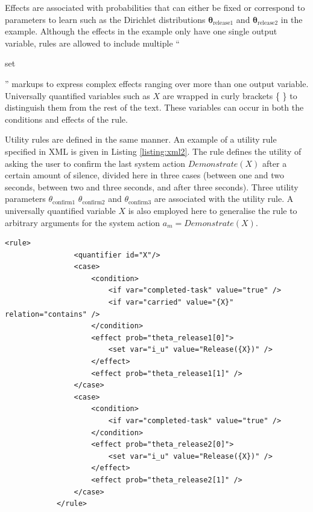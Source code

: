 Effects are associated with probabilities that can either be fixed or correspond to parameters to learn such as the Dirichlet distributions $\boldsymbol\theta_{\text{release1}}$ and $\boldsymbol\theta_{\text{release2}}$ in the example.  Although the effects in the example only have one single output variable, rules are allowed to include multiple ``\begin{small}\textsf{set}\end{small}'' markups to express complex effects ranging over more than one output variable. Universally quantified variables such as $X$ are wrapped in curly brackets \{ \} to distinguish them from the rest of the text. These variables can occur in both the conditions and effects of the rule. 

Utility rules are defined in the same manner.  An example of a utility rule specified in XML is given in Listing \ref{listing:xml2}.  The rule defines the utility of asking the user to confirm the last system action $\mathit{Demonstrate}(X)$ after a certain amount of silence, divided here in three cases (between one and two seconds, between two and three seconds, and after three seconds).  Three utility parameters $\theta_{\text{confirm1}}$ $\theta_{\text{confirm2}}$ and $\theta_{\text{confirm3}}$ are associated with the utility rule.  A universally quantified variable $X$ is also employed here to generalise the rule to arbitrary arguments for the system action $a_m = \mathit{Demonstrate}(X)$. 

\begin{lstlisting}[label=listing:xml1,caption=Example of probability rule in XML format., float=p,captionpos=b]
            <rule>
                <quantifier id="X"/>
                <case>
                    <condition>
                        <if var="completed-task" value="true" />
                        <if var="carried" value="{X}" relation="contains" />
                    </condition>
                    <effect prob="theta_release1[0]">
                        <set var="i_u" value="Release({X})" />
                    </effect>
                    <effect prob="theta_release1[1]" />
                </case>
                <case>
                    <condition>
                        <if var="completed-task" value="true" />
                    </condition>
                    <effect prob="theta_release2[0]">
                        <set var="i_u" value="Release({X})" />
                    </effect>
                    <effect prob="theta_release2[1]" />
                </case>
            </rule>
\end{lstlisting}



